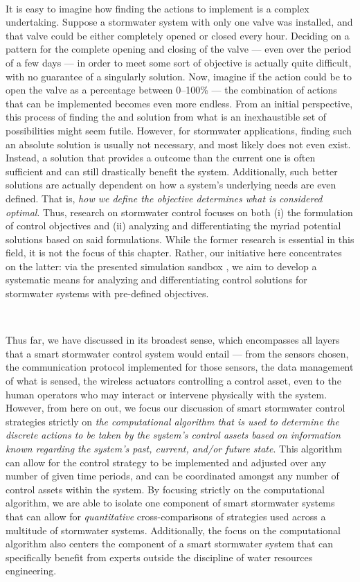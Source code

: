 \

It is easy to imagine how finding the  actions to implement is a complex undertaking. Suppose a stormwater system with only one valve was installed, and that valve could be either completely opened or closed every hour. Deciding on a pattern for the complete opening and closing of the valve --- even over the period of a few days --- in order to meet some sort of objective is actually quite difficult, with no guarantee of a singularly  solution. Now, imagine if the action could be to open the valve as a percentage between 0--100\% --- the combination of actions that can be implemented becomes even more endless. From an initial perspective, this process of finding the  and  solution from what is an inexhaustible set of possibilities might seem futile. However, for stormwater applications, finding such an absolute  solution is usually not necessary, and most likely does not even exist. Instead, a solution that provides a  outcome than the current one is often sufficient and can still drastically benefit the system. Additionally, such better solutions are actually dependent on how a system's underlying needs are even defined. That is, \emph{how we define the objective determines what is considered optimal}. Thus, research on stormwater control focuses on both (i) the formulation of control objectives and (ii) analyzing and differentiating the myriad potential solutions based on said formulations. While the former research is essential in this field, it is not the focus of this chapter. Rather, our initiative here concentrates on the latter: via the presented simulation sandbox \pystormsNOSPACE, we aim to develop a systematic means for analyzing and differentiating control solutions for stormwater systems with pre-defined objectives.

\

Thus far, we have discussed  in its broadest sense, which encompasses all layers that a smart stormwater control system would entail --- from the sensors chosen, the communication protocol implemented for those sensors, the data management of what is sensed, the wireless actuators controlling a control asset, even to the human operators who may interact or intervene physically with the system. However, from here on out, we focus our discussion of smart stormwater control strategies strictly on \emph{the computational algorithm that is used to determine the discrete actions to be taken by the system's control assets based on information known regarding the system's past, current, and/or future state}. This algorithm can allow for the control strategy to be implemented and adjusted over any number of given time periods, and can be coordinated amongst any number of control assets within the system. By focusing strictly on the computational algorithm, we are able to isolate one component of smart stormwater systems that can allow for \emph{quantitative} cross-comparisons of strategies used across a multitude of stormwater systems. Additionally, the focus on the computational algorithm also centers the component of a smart stormwater system that can specifically benefit from experts outside the discipline of water resources engineering.
%
%
%
